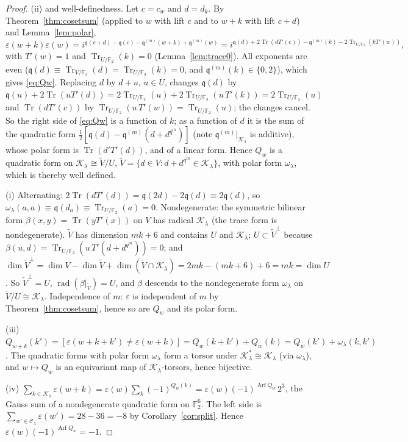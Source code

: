 \documentclass[12pt,a4paper]{amsart}
\theoremstyle{definition}
\newcommand{\F}{\mathbb{F}}
\newcommand{\Tr}{\operatorname{Tr}}
\newcommand{\Arf}{\operatorname{Arf}}
\newcommand{\rad}{\operatorname{rad}}
\newcommand{\eps}{\varepsilon}
\newcommand{\Kk}{\mathcal{K}}
\newcommand{\Cc}{\mathcal{C}}
\newcommand{\qq}{\mathfrak{q}}
\begin{document}
\begin{proof}
(ii) and well-definedness. Let $c=c_w$ and $d=d_k$. By Theorem~\ref{thm:cosetsum} (applied to $w$ with lift $c$ and to $w+k$ with lift $c+d$) and Lemma~\ref{lem:polar},
\[
\eps(w+k)\eps(w)=i^{\qq(c+d)-\qq(c)-\qq^{(m)}(w+k)+\qq^{(m)}(w)}=i^{\qq(d)+2\Tr(dT'(c))-\qq^{(m)}(k)-2\Tr_{U/\F_2}(kT'(w))},
\]
with $T'(w)=1$ and $\Tr_{U/\F_2}(k)=0$ (Lemma~\ref{lem:trace0}). All exponents are even ($\qq(d)\equiv\Tr_{V/\F_2}(d)=\Tr_{U/\F_2}(k)=0$, and $\qq^{(m)}(k)\in\{0,2\}$), which gives \eqref{eq:Qw}. Replacing $d$ by $d+u$, $u\in U$, changes $\qq(d)$ by $\qq(u)+2\Tr(uT'(d))=2\Tr_{U/\F_2}(u)+2\Tr_{U/\F_2}(u\,T'(k))=2\Tr_{U/\F_2}(u)$ and $\Tr(dT'(c))$ by $\Tr_{U/\F_2}(u\,T'(w))=\Tr_{U/\F_2}(u)$; the changes cancel. So the right side of \eqref{eq:Qw} is a function of $k$; as a function of $d$ it is the sum of the quadratic form $\frac12[\qq(d)-\qq^{(m)}(d+d^{q^m})]$ (note $\qq^{(m)}|_{\Kk_\lambda}$ is additive), whose polar form is $\Tr(d'T'(d))$, and of a linear form. Hence $Q_w$ is a quadratic form on $\Kk_\lambda\cong\widetilde V/U$, $\widetilde V=\{d\in V: d+d^{q^m}\in\Kk_\lambda\}$, with polar form $\omega_\lambda$, which is thereby well defined.

(i) Alternating: $2\Tr(dT'(d))=\qq(2d)-2\qq(d)\equiv2\qq(d)$, so $\omega_\lambda(a,a)\equiv\qq(d_a)\equiv\Tr_{U/\F_2}(a)=0$. Nondegenerate: the symmetric bilinear form $\beta(x,y)=\Tr(yT'(x))$ on $V$ has radical $\Kk_\lambda$ (the trace form is nondegenerate). $\widetilde V$ has dimension $mk+6$ and contains $U$ and $\Kk_\lambda$; $U\subset\widetilde V^{\perp}$ because $\beta(u,d)=\Tr_{U/\F_2}(u\,T'(d+d^{q^m}))=0$; and $\dim\widetilde V^{\perp}=\dim V-\dim\widetilde V+\dim(\widetilde V\cap\Kk_\lambda)=2mk-(mk+6)+6=mk=\dim U$. So $\widetilde V^\perp=U$, $\rad(\beta|_{\widetilde V})=U$, and $\beta$ descends to the nondegenerate form $\omega_\lambda$ on $\widetilde V/U\cong\Kk_\lambda$. Independence of $m$: $\eps$ is independent of $m$ by Theorem~\ref{thm:cosetsum}, hence so are $Q_w$ and its polar form.

(iii) $Q_{w+k}(k')=[\eps(w+k+k')\ne\eps(w+k)]=Q_w(k+k')+Q_w(k)=Q_w(k')+\omega_\lambda(k,k')$. The quadratic forms with polar form $\omega_\lambda$ form a torsor under $\Kk_\lambda^*\cong\Kk_\lambda$ (via $\omega_\lambda$), and $w\mapsto Q_w$ is an equivariant map of $\Kk_\lambda$-torsors, hence bijective.

(iv) $\sum_{k\in\Kk_\lambda}\eps(w+k)=\eps(w)\sum_k(-1)^{Q_w(k)}=\eps(w)(-1)^{\Arf Q_w}\,2^3$, the Gauss sum of a nondegenerate quadratic form on $\F_2^6$. The left side is $\sum_{w'\in\Cc_\lambda}\eps(w')=28-36=-8$ by Corollary~\ref{cor:split}. Hence $\eps(w)(-1)^{\Arf Q_w}=-1$.
\end{proof}
\end{document}
